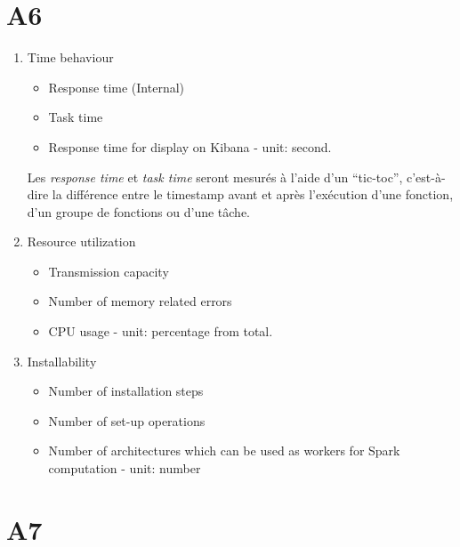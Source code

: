 \section{A6}
  \begin{enumerate}
    \item Time behaviour
      \begin{itemize}
        \item Response time (Internal)
        \item Task time
        \item Response time for display on Kibana - unit: second.
      \end{itemize} \bigskip

      Les \emph{response time} et \emph{task time} seront mesurés à l'aide d'un ``tic-toc'', c'est-à-dire la différence entre le timestamp avant et après l'exécution d'une fonction, d'un groupe de fonctions ou d'une tâche. \\

    \item Resource utilization
      \begin{itemize}
        \item Transmission capacity
        \item Number of memory related errors
        \item CPU usage - unit: percentage from total.
      \end{itemize} \bigskip

    \item Installability
      \begin{itemize}
        \item Number of installation steps
        \item Number of set-up operations
        \item Number of architectures which can be used as workers for Spark computation - unit: number
      \end{itemize} \bigskip
  \end{enumerate}

\section{A7}
